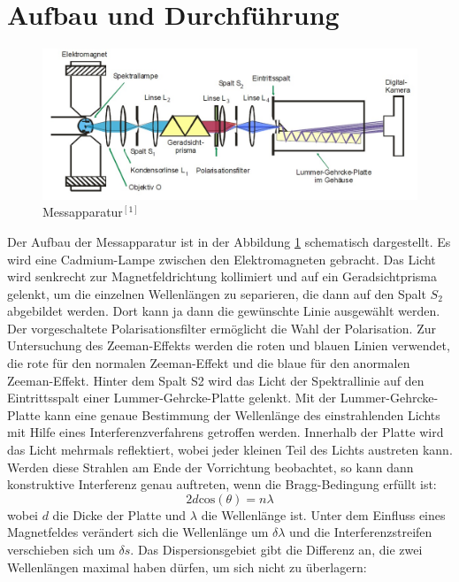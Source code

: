 \documentclass{article}
\begin{document}
	\section{Aufbau und Durchführung}
	\label{sec:AufbauundDurchführung}
	\begin{figure}[H]
		\centering
		\includegraphics[width=0.9\linewidth]{Messapparatur.jpg}
		\caption{Messapparatur$^{[1]}$}
		\label{fig:messapparatur}
	\end{figure}
	Der Aufbau der Messapparatur ist in der Abbildung \ref{fig:messapparatur} schematisch dargestellt. Es wird eine Cadmium-Lampe zwischen den Elektromagneten gebracht. Das Licht wird senkrecht zur Magnetfeldrichtung kollimiert und auf ein Geradsichtprisma gelenkt, um die einzelnen Wellenlängen zu separieren, die dann auf den Spalt $S_2$ abgebildet werden. Dort kann ja dann die gewünschte Linie ausgewählt werden. Der vorgeschaltete Polarisationsfilter ermöglicht die Wahl der Polarisation. Zur Untersuchung des Zeeman-Effekts werden die roten und blauen Linien verwendet, die rote für den normalen Zeeman-Effekt und die blaue für den anormalen Zeeman-Effekt. Hinter dem Spalt S2 wird das Licht der Spektrallinie auf den Eintrittsspalt einer Lummer-Gehrcke-Platte gelenkt.
	Mit der Lummer-Gehrcke-Platte kann eine genaue Bestimmung der Wellenlänge des einstrahlenden Lichts mit Hilfe eines Interferenzverfahrens getroffen werden. Innerhalb der Platte wird das Licht mehrmals reflektiert, wobei jeder kleinen Teil des Lichts austreten kann. Werden diese Strahlen am Ende der Vorrichtung beobachtet, so kann dann konstruktive Interferenz genau auftreten, wenn die Bragg-Bedingung erfüllt ist:
	\begin{equation}
	2d\text{cos}(\theta) = n\lambda
	\end{equation}
	wobei $d$ die Dicke der Platte und $\lambda$ die Wellenlänge ist. Unter dem Einfluss eines Magnetfeldes verändert sich die Wellenlänge um $\delta\lambda$ und die Interferenzstreifen verschieben sich um $\delta s$.
	Das Dispersionsgebiet gibt die Differenz an, die zwei Wellenlängen maximal haben dürfen, um sich nicht zu überlagern:
\end{document}
